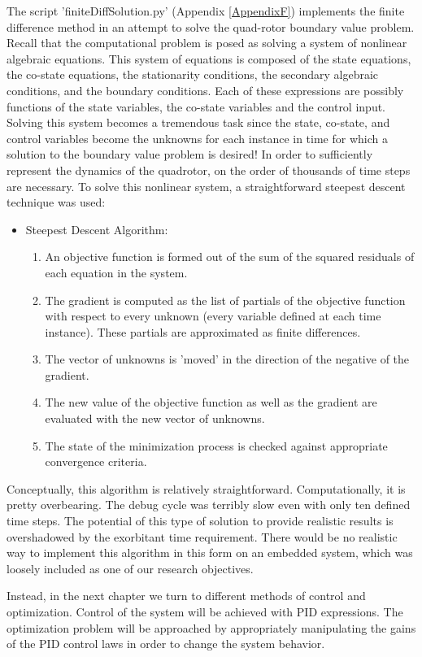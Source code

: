 The script 'finiteDiffSolution.py' (Appendix \ref{AppendixF}) implements the finite difference method in an attempt to solve the quad-rotor boundary value problem. Recall that the computational problem is posed as solving a system of nonlinear algebraic equations. This system of equations is composed of the state equations, the co-state equations, the stationarity conditions, the secondary algebraic conditions, and the boundary conditions. Each of these expressions are possibly functions of the state variables, the co-state variables and the control input. Solving this system becomes a tremendous task since the state, co-state, and control variables become the unknowns for each instance in time for which a solution to the boundary value problem is desired! In order to sufficiently represent the dynamics of the quadrotor, on the order of thousands of time steps are necessary. To solve this nonlinear system, a straightforward steepest descent technique was used:


\begin{itemize}
\item Steepest Descent Algorithm:
\begin{enumerate}
    \item{An objective function is formed out of the sum of the squared residuals of each equation in the system.}
    \item{The gradient is computed as the list of partials of the objective function with respect to every unknown (every variable defined at each time instance). These partials are approximated as finite differences.}
    \item{The vector of unknowns is 'moved' in the direction of the negative of the gradient.}
    \item{The new value of the objective function as well as the gradient are evaluated with the new vector of unknowns. }
    \item{The state of the minimization process is checked against appropriate convergence criteria.}
\end{enumerate}
\end{itemize}


Conceptually, this algorithm is relatively straightforward. Computationally, it is pretty overbearing. The debug cycle was terribly slow even with only ten defined time steps. The potential of this type of solution to provide realistic results is overshadowed by the exorbitant time requirement. There would be no realistic way to implement this algorithm in this form on an embedded system, which was loosely included as one of our research objectives.

Instead, in the next chapter we turn to different methods of control and optimization. Control of the system will be achieved with PID expressions. The optimization problem will be approached by appropriately manipulating the gains of the PID control laws in order to change the system behavior.








